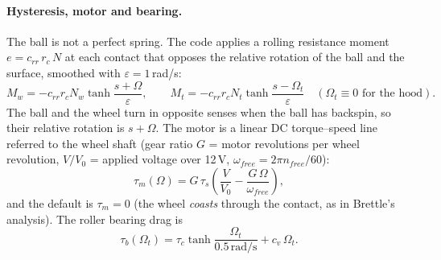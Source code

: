 \paragraph{Hysteresis, motor and bearing.} The ball is not a perfect spring. The code applies a rolling
resistance moment $e = c_{rr}\, r_c\, N$ at each contact that opposes the relative rotation of the ball and
the surface, smoothed with $\varepsilon = 1$\,\unit{rad/s}\assumed:
\begin{equation}
  M_w = -c_{rr} r_c N_w \tanh\!\frac{s + \Omega}{\varepsilon}, \qquad
  M_t = -c_{rr} r_c N_t \tanh\!\frac{s - \Omega_t}{\varepsilon}\quad(\Omega_t \equiv 0 \text{ for the hood}).
  \label{eq:launcher-hyst}
\end{equation}
The ball and the wheel turn in opposite senses when the ball has backspin, so their relative rotation is
$s+\Omega$. The motor is a linear DC torque--speed line referred to the wheel shaft (gear ratio $G$ =
motor revolutions per wheel revolution, $V/V_0$ = applied voltage over 12\,\unit{V}\confirmed,
$\omega_{free} = 2\pi n_{free}/60$):
\begin{equation}
  \tau_m(\Omega) = G\,\tau_s\left(\frac{V}{V_0} - \frac{G\,\Omega}{\omega_{free}}\right),
  \label{eq:launcher-motor}
\end{equation}
and the default is $\tau_m = 0$ (the wheel \emph{coasts} through the contact, as in Brettle's analysis).
The roller bearing drag is
\begin{equation}
  \tau_b(\Omega_t) = \tau_c \tanh\!\frac{\Omega_t}{0.5\,\text{rad/s}} + c_v\,\Omega_t .
  \label{eq:launcher-bearing}
\end{equation}

